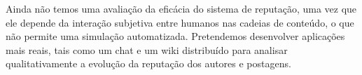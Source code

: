 \documentclass[12pt]{article}
\begin{document}
Ainda não temos uma avaliação da eficácia do sistema de reputação, uma vez que
ele depende da interação subjetiva entre humanos nas cadeias de conteúdo, o que
não permite uma simulação automatizada.
Pretendemos desenvolver aplicações mais reais, tais como um chat e um wiki
distribuído para analisar qualitativamente a evolução da reputação dos autores
e postagens.



\end{document}
